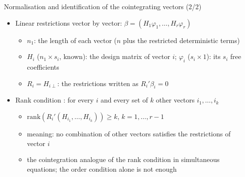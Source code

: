 \begin{frame}{Normalisation and identification of the cointegrating vectors (2/2)}
\itemsize{\small}
\begin{itemize}
    \item Linear restrictions vector by vector: $\beta = (H_1\varphi_1, \dots, H_r\varphi_r)$
    \begin{itemize}
        \item $n_1$: the length of each vector ($n$ plus the restricted deterministic terms)
        \item $H_i$ ($n_1\times s_i$, known): the design matrix of vector $i$; $\varphi_i$ ($s_i\times 1$): its $s_i$ free coefficients
        \item $R_i = H_{i\perp}$: the restrictions written as $R_i'\beta_i = 0$
    \end{itemize}
    \item Rank condition : for every $i$ and every set of $k$ other vectors $i_1, \dots, i_k$
    \begin{itemize}
        \item $\mathrm{rank}(R_i'(H_{i_1}, \dots, H_{i_k})) \ge k$, $k = 1, \dots, r - 1$
        \item meaning: no combination of other vectors satisfies the restrictions of vector $i$
        \item the cointegration analogue of the rank condition in simultaneous equations; the order condition alone is not enough
    \end{itemize}
\end{itemize}
\end{frame}

